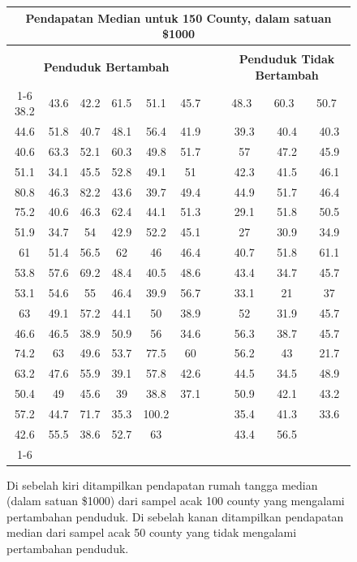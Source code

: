 \newcommand{\npgpad}[1]{\hspace{2mm}#1\hspace{1.5mm}\ }
\begin{figure}[h]
\centering
\begin{tabular}{ ccc ccc c ccc }
\multicolumn{10}{c}{\bf Pendapatan Median untuk 150 County,
    dalam satuan \$1000} \\
\hline
\vspace{-2mm} \\
\multicolumn{6}{c}{\bf Penduduk Bertambah} &\hspace{5mm}\ &
    \multicolumn{3}{c}{\bf Penduduk Tidak Bertambah} \\
  \cline{1-6} \cline{8-10}
38.2 & 43.6 & 42.2 & 61.5 & 51.1 & 45.7 &&
    \npgpad{48.3} & \npgpad{60.3} & \npgpad{50.7} \\
44.6 & 51.8 & 40.7 & 48.1 & 56.4 & 41.9 && 39.3 & 40.4 & 40.3 \\
40.6 & 63.3 & 52.1 & 60.3 & 49.8 & 51.7 && 57 & 47.2 & 45.9 \\
51.1 & 34.1 & 45.5 & 52.8 & 49.1 & 51 && 42.3 & 41.5 & 46.1 \\
80.8 & 46.3 & 82.2 & 43.6 & 39.7 & 49.4 && 44.9 & 51.7 & 46.4 \\
75.2 & 40.6 & 46.3 & 62.4 & 44.1 & 51.3 && 29.1 & 51.8 & 50.5 \\
51.9 & 34.7 & 54 & 42.9 & 52.2 & 45.1 && 27 & 30.9 & 34.9 \\
61 & 51.4 & 56.5 & 62 & 46 & 46.4 && 40.7 & 51.8 & 61.1 \\
53.8 & 57.6 & 69.2 & 48.4 & 40.5 & 48.6 && 43.4 & 34.7 & 45.7 \\
53.1 & 54.6 & 55 & 46.4 & 39.9 & 56.7 && 33.1 & 21 & 37 \\
63 & 49.1 & 57.2 & 44.1 & 50 & 38.9 && 52 & 31.9 & 45.7 \\
46.6 & 46.5 & 38.9 & 50.9 & 56 & 34.6 && 56.3 & 38.7 & 45.7 \\
74.2 & 63 & 49.6 & 53.7 & 77.5 & 60 && 56.2 & 43 & 21.7 \\
63.2 & 47.6 & 55.9 & 39.1 & 57.8 & 42.6 && 44.5 & 34.5 & 48.9 \\
50.4 & 49 & 45.6 & 39 & 38.8 & 37.1 && 50.9 & 42.1 & 43.2 \\
57.2 & 44.7 & 71.7 & 35.3 & 100.2 &  && 35.4 & 41.3 & 33.6 \\
42.6 & 55.5 & 38.6 & 52.7 & 63 &  && 43.4 & 56.5 &  \\
\cline{1-6} \cline{8-10}
\end{tabular}
\caption{Di sebelah kiri ditampilkan pendapatan rumah tangga median
    (dalam satuan \$1000) dari sampel acak 100 county yang
    mengalami pertambahan penduduk.
    Di sebelah kanan ditampilkan pendapatan median dari sampel acak
    50 county yang tidak mengalami pertambahan penduduk.}
\label{countyIncomeSplitByPopGainTable}
\end{figure}

